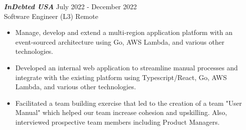 {\sl \textbf{InDebted USA}} \hfill July 2022 - December 2022 \\ Software Engineer (L3) \hfill Remote
\begin{itemize}
    \item Manage, develop and extend a multi-region application platform with an event-sourced architecture using Go, AWS Lambda, and various other technologies.
    \item Developed an internal web application to streamline manual processes and integrate with the existing platform using Typescript/React, Go, AWS Lambda, and various other technologies.
    \item Facilitated a team building exercise that led to the creation of a team "User Manual" which helped our team increase cohesion and upskilling. Also, interviewed prospective team members including Product Managers.
\end{itemize}
